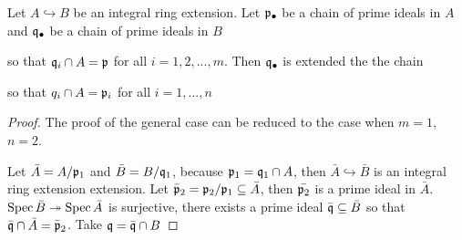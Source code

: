 \begin{theorem}
	Let $A \hookrightarrow B$ be an integral ring extension. Let $\mathfrak{p}_\bullet$ be a chain of prime ideals in $A$ and $\mathfrak{q}_\bullet$ be a chain of prime ideals in $B$
	\begin{center}
	\end{center}
	
	so that $\mathfrak{q}_i \cap A = \mathfrak{p}$ for all $i=1, 2, ..., m$. Then $\mathfrak{q}_\bullet$ is extended the the chain
	\begin{center}
	\end{center}
	so that $q_i \cap A = \mathfrak{p}_i$ for all $i=1, ..., n$
\end{theorem}

\begin{proof}
	The proof of the general case can be reduced to the case when $m = 1$, $n = 2$.
	\begin{center}
	\end{center}
	Let $\bar{A} = A / \mathfrak{p}_1$ and $\bar{B} = B / \mathfrak{q}_1$, because $\mathfrak{p}_1 = \mathfrak{q}_1 \cap A$, then $\bar{A} \hookrightarrow \bar{B}$ is an integral ring extension extension. Let $\bar{\mathfrak{p}}_2 = \mathfrak{p}_2 / \mathfrak{p}_1 \subseteq \bar{A}$, then $\bar{\mathfrak{p}_2}$ is a prime ideal in $\bar{A}$. $\operatorname{Spec} \bar{B} \twoheadrightarrow \operatorname{Spec} \bar{A}$ is surjective, there exists a prime ideal $\bar{\mathfrak{q}} \subseteq \bar{B}$ so that $\bar{\mathfrak{q}} \cap \bar{A} = \bar{\mathfrak{p}}_2$. Take $\mathfrak{q} = \bar{\mathfrak{q}} \cap B$
\end{proof}

